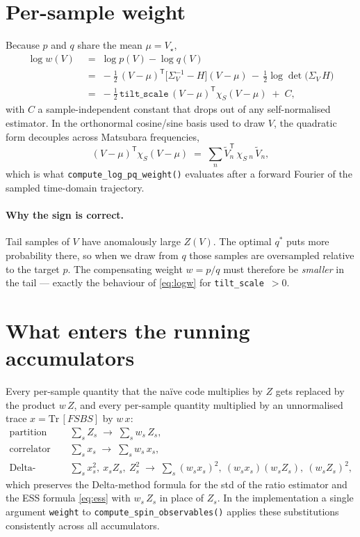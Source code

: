 \documentclass[11pt]{article}
\newcommand{\Tr}{\mathrm{Tr}\,}
\newcommand{\T}{\mathsf{T}}
\newcommand{\Sig}{\Sigma_V}
\newcommand{\Sinv}{\Sig^{-1}}
\begin{document}
\section{Per-sample weight}

Because $p$ and $q$ share the mean $\mu = V_\star$,
\begin{align}
  \log w(V) \;&=\; \log p(V) - \log q(V) \nonumber\\
  \;&=\; -\tfrac{1}{2}\,(V-\mu)^{\T}\bigl[\Sinv - H\bigr](V-\mu)
        \,-\, \tfrac{1}{2}\log\det\!\bigl(\Sig\,H\bigr) \nonumber\\
  \;&=\; -\tfrac{1}{2}\,\texttt{tilt\_scale}\,(V-\mu)^{\T}\chi_S(V-\mu)
        \;+\; C,
  \label{eq:logw}
\end{align}
with $C$ a sample-independent constant that drops out of any
self-normalised estimator.
In the orthonormal cosine/sine basis used to draw $V$, the quadratic
form decouples across Matsubara frequencies,
\begin{equation}
  (V-\mu)^{\T}\chi_S(V-\mu)
  \;=\; \sum_{n} \tilde V_n^{\T}\,\chi_S\,_n\,\tilde V_n,
  \label{eq:quad}
\end{equation}
which is what \verb!compute_log_pq_weight()! evaluates after a forward
Fourier of the sampled time-domain trajectory.

\paragraph{Why the sign is correct.}
Tail samples of $V$ have anomalously large $Z(V)$. The optimal $q^*$
puts more probability there, so when we draw from $q$ those samples are
oversampled relative to the target $p$. The compensating weight
$w = p/q$ must therefore be \emph{smaller} in the tail — exactly the
behaviour of \eqref{eq:logw} for \verb!tilt_scale!~$>0$.

\section{What enters the running accumulators}

Every per-sample quantity that the naïve code multiplies by $Z$ gets
replaced by the product $w\,Z$, and every per-sample quantity multiplied
by an unnormalised trace $x = \Tr[FSBS]$ by $w\,x$:
\begin{align}
  \text{partition function:}\quad &
  \sum_s Z_s \;\longrightarrow\; \sum_s w_s\,Z_s, \\
  \text{correlator estimator:}\quad &
  \sum_s x_s \;\longrightarrow\; \sum_s w_s\,x_s, \\
  \text{Delta-method second moments:}\quad &
  \sum_s x_s^{2},\ x_s Z_s,\ Z_s^{2}
  \;\longrightarrow\;
  \sum_s (w_s x_s)^{2},\ (w_s x_s)(w_s Z_s),\ (w_s Z_s)^{2},
\end{align}
which preserves the Delta-method formula for the std of the ratio
estimator and the ESS formula \eqref{eq:ess} with $w_s\,Z_s$ in place of
$Z_s$. In the implementation a single argument \verb!weight! to
\verb!compute_spin_observables()! applies these substitutions
consistently across all accumulators.
\end{document}
